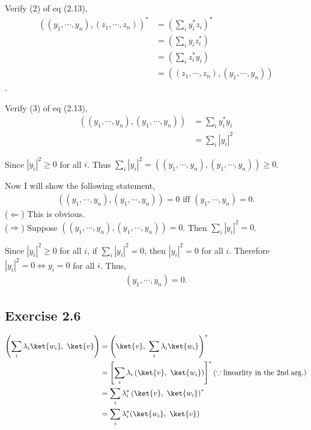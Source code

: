 \documentclass[a4paper,12pt]{article}
\begin{document}
Verify (2) of eq (2.13),
\begin{align}
	\left(
		(y_1, \cdots, y_n), (z_1, \cdots, z_n)
	\right)^*
	&= \left(\sum_i y_i^* z_i \right)^*\\
	&= \left(\sum_i y_i  z_i^* \right)\\
	&= \left(\sum_i z_i^* y_i \right)\\
	&= \left(
				(z_1, \cdots, z_n) , (y_1, \cdots, y_n)
			\right)
\end{align}.


Verify (3) of eq (2.13),
\begin{align*}
	\left(
		(y_1, \cdots, y_n), (y_1, \cdots, y_n)
	\right)
	&= \sum_i y_i^* y_i\\
	&= \sum_i |y_i|^2
\end{align*}

Since $|y_i|^2 \geq 0$ for all $i$. Thus
$\sum_i |y_i|^2 =
\left(
	(y_1, \cdots, y_n), (y_1, \cdots, y_n)
\right) \geq 0
$.

Now I will show the following statement,
\begin{align*}
	\left(
		(y_1, \cdots, y_n), (y_1, \cdots, y_n)
	\right) = 0
	\text{ iff }  (y_1, \cdots, y_n) = 0.
\end{align*}
($\Leftarrow$) This is obvious.\\
($\Rightarrow$)
Suppose $\left( (y_1, \cdots, y_n), (y_1, \cdots, y_n) \right) = 0$. Then $\sum_i |y_i|^2 = 0$.

Since $|y_i|^2 \geq 0$ for all $i$, if $\sum_i |y_i|^2 = 0$, then $|y_i|^2 = 0$ for all $i$.
Therefore $|y_i|^2 = 0 \Leftrightarrow y_i = 0$  for all $i$.
Thus,
\begin{align*}
	(y_1, \cdots, y_n) = 0.
\end{align*}

\subsection*{Exercise 2.6}
\begin{align*}
	\left(\sum_i \lambda_i \ket{w_i},\ \ket{v}\right) &=
	\left(\ket{v},\ \sum_i \lambda_i \ket{w_i}\right)^*\\
	&= \left[\sum_i \lambda_i \left(\ket{v},\ \ket{w_i}  \right) \right]^* (\because \text{linearlity in the 2nd arg.})\\
	&= \sum_i \lambda_i^* \left(\ket{v},\ \ket{w_i} \right)^*\\
	&= \sum_i \lambda_i^* (\ket{w_i},\ \ket{v})
\end{align*}
\end{document}
